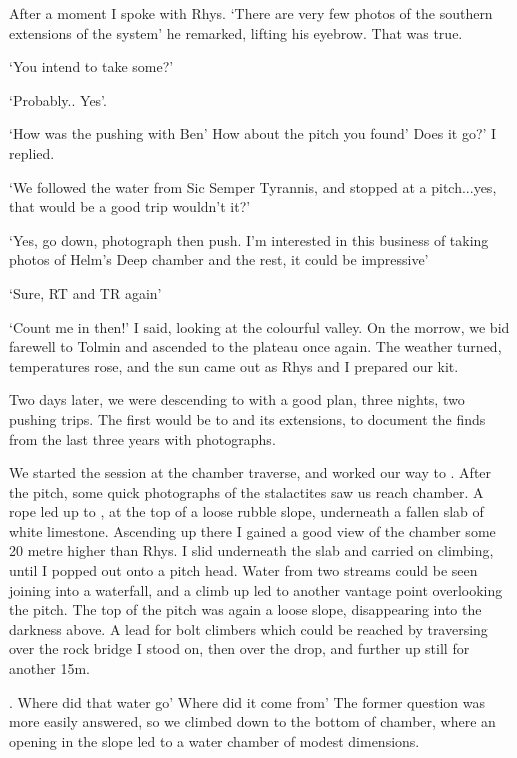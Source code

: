     After a moment I spoke with Rhys.
    `There are very few photos of the southern extensions of the system' he remarked, lifting his eyebrow.  That was true. 

`You intend to take some?'

    `Probably.. Yes'.

    `How was the pushing with Ben' How about the pitch you found' Does it go?' I replied.

    `We followed the water from Sic Semper Tyrannis, and stopped at a pitch...yes, that would be a good trip wouldn't it?'

    `Yes, go down, photograph then push. I'm interested in this business of taking photos of Helm's Deep chamber and the rest, it could be impressive'

    `Sure, RT and TR again'

    `Count me in then!' I said, looking at the colourful valley. On the morrow, we bid farewell to Tolmin and ascended to the plateau once again. The weather turned, temperatures rose, and the sun came out as Rhys and I prepared our kit.

    Two days later, we were descending to  with a good plan, three nights, two pushing trips. The first would be to  and its extensions, to document the finds from the last three years with photographs.

    We started the session at the  chamber traverse, and worked our way to . After the pitch, some quick photographs of the  stalactites saw us reach  chamber. A rope led up to , at the top of a loose rubble slope, underneath a fallen slab of white limestone. Ascending up there I gained a good view of the chamber some 20 metre higher than Rhys. I slid underneath the slab and carried on climbing, until I popped out onto a pitch head. Water from two streams could be seen joining into a waterfall, and a climb up led to another vantage point overlooking the pitch. The top of the pitch was again a loose slope, disappearing into the darkness above. A lead for bolt climbers which could be reached by traversing over the rock bridge I stood on, then over the drop, and further up still for another 15m.

	. Where did that water go' Where did it come from' The former question was more easily answered, so we climbed down to the bottom of  chamber, where an opening in the slope led to a water chamber of modest dimensions.

